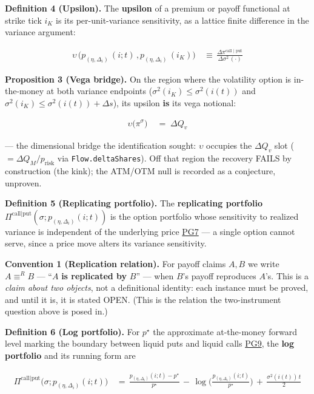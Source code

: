 \documentclass[11pt]{article}
\renewcommand{\_}{\textunderscore\allowbreak}
\begin{document}
\textbf{Definition 4 (Upsilon).} The \textbf{upsilon} of a premium or payoff functional at strike tick \(i_K\) is its per-unit-variance sensitivity, as a lattice finite difference in the variance argument:

\[
    \begin{aligned}
        \upsilon \, \Big (p_{(\eta, \Delta_i)} \, (i; t) \, , p_{(\eta, \Delta_i)} \, (i_K)\Big)\, &\equiv \, \frac{\Delta \pi^{\text{call | put}}}{\Delta \sigma^2 \, (\cdot)}
    \end{aligned}
\]

\textbf{Proposition 3 (Vega bridge).} On the region where the volatility option is in-the-money at both variance endpoints (\(\sigma^2(i_K) \le \sigma^2(i(t))\) and \(\sigma^2(i_K) \le \sigma^2(i(t)) + \Delta s\)), its upsilon \textbf{is} its vega notional:

\[
    \begin{aligned}
        \upsilon\big(\pi^{\sigma}\big) \;&=\; \Delta Q_v
    \end{aligned}
\]

--- the dimensional bridge the identification sought: \(\upsilon\) occupies the \(\Delta Q_v\) slot (\(= \Delta Q_M/p_{\text{risk}}\) via \texttt{Flow.deltaShares}). Off that region the recovery FAILS by construction (the kink); the ATM/OTM null is recorded as a conjecture, unproven.

\textbf{Definition 5 (Replicating portfolio).} The \textbf{replicating portfolio} \(\Pi^{\text{call|put}}(\sigma; p_{(\eta,\Delta_i)}(i;t))\) is the option portfolio whose sensitivity to realized variance is independent of the underlying price \href{../refs/DemeterfietalVarianceSwaps.pdf}{PG7} --- a single option cannot serve, since a price move alters its variance sensitivity.

\textbf{Convention 1 (Replication relation).} For payoff claims \(A, B\) we write \(A \equiv^{R} B\) --- ``\(A\) \textbf{is replicated by} \(B\)'' --- when \(B\)'s payoff reproduces \(A\)'s. This is a \emph{claim about two objects}, not a definitional identity: each instance must be proved, and until it is, it is stated OPEN. (This is the relation the two-instrument question above is posed in.)

\textbf{Definition 6 (Log portfolio).} For \(p^{\star}\) the approximate at-the-money forward level marking the boundary between liquid puts and liquid calls \href{../refs/DemeterfietalVarianceSwaps.pdf}{PG9}, the \textbf{log portfolio} and its running form are

\[
    \begin{aligned}
        \Pi^{\text{call|put}}\big(\sigma; p_{(\eta,\Delta_i)}(i;t)\big) \, &= \, \frac{p_{(\eta,\Delta_i)}(i;t) - p^{\star}}{p^{\star}} \, - \, \log\Big(\frac{p_{(\eta,\Delta_i)}(i;t)}{p^{\star}}\Big) \, + \, \frac{\sigma^2(i(t))\, t}{2}
    \end{aligned}
\]
\end{document}
